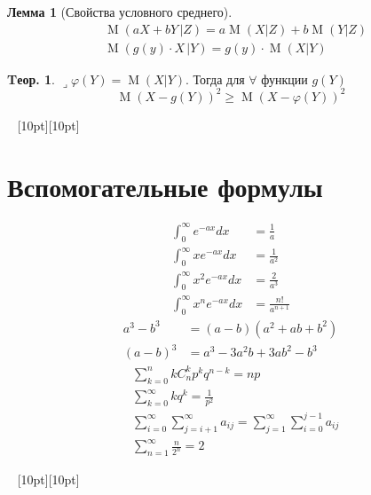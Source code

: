\documentclass[a4paper,12pt,fleqn]{article}
\numberwithin{figure}{section}
\theoremstyle{definition}
\newtheorem{theorem}{Tеор.}[section]
\newtheorem{lemma}{Лемма}[section]
\let\phi\varphi
\let\geqs\geqslant
\DeclareMathOperator{\M}{M}
\def\lets{{\huge$\lrcorner$}\space}
\def\vignette{\vspace{48pt} \noindent \hrulefill~
	          \raisebox{-8pt}[10pt][10pt]{\Huge\ding{102}}
	          ~\hrulefill}
\begin{document}
\begin{lemma}[Свойства условного среднего]
\begin{align*}
&	\M(aX+bY\,|Z) = a\M(X|Z)+b\M(Y|Z)	\\
&	\M(g(y) \cdot X \,|Y) = g(y) \cdot \M(X|Y)
\end{align*}
\end{lemma}

\begin{theorem}
\lets $\phi(Y)=\M(X|Y)$.
Тогда для $\forall$ функции $g(Y)$
\[ \M\left( X - g(Y) \right)^2 \geqs \M\left( X - \phi(Y) \right)^2 \]
\end{theorem}



\vignette
\section{Вспомогательные формулы}

\begin{align*}
	   \int_0^\infty     e^{-ax}dx &= \frac{1}{a}
	\\ \int_0^\infty x   e^{-ax}dx &= \frac{1}{a^2}
	\\ \int_0^\infty x^2 e^{-ax}dx &= \frac{2}{a^3}
	\\ \int_0^\infty x^n e^{-ax}dx &= \frac{n!}{a^{n+1}}
\end{align*}
\begin{align*}
	   a^3-b^3 &= (a-b)(a^2+ab+b^2)
	\\ (a-b)^3 &= a^3-3a^2b+3ab^2-b^3
\end{align*}
\begin{align*}
&	\sum_{k=0}^n k C_n^k p^k q^{n-k} = np \\
&	\sum_{k=0}^{\infty}kq^k = \frac{1}{p^2} \\
&	\sum_{i=0}^{\infty}\sum_{j=i+1}^{\infty}a_{ij} =
	\sum_{j=1}^{\infty}\sum_{i=0}^{j-1}a_{ij} \\
&	\sum_{n=1}^{\infty}\frac{n}{2^n} = 2
\end{align*}

\vignette
\end{document}
